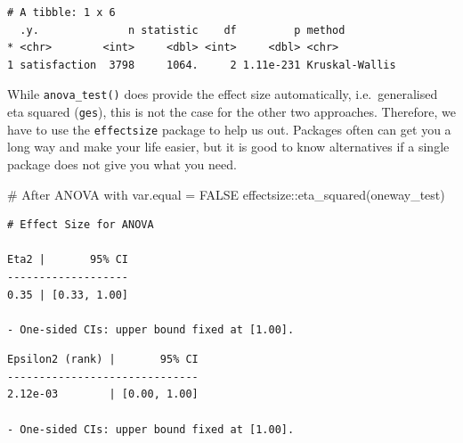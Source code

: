 \documentclass[
  letterpaper,
]{krantz}
\makeatletter
\newenvironment{Shaded}{\begin{snugshade}}{\end{snugshade}}
\newcommand{\CommentTok}[1]{\textcolor[rgb]{0.37,0.37,0.37}{#1}}
\newcommand{\FunctionTok}[1]{\textcolor[rgb]{0.28,0.35,0.67}{#1}}
\newcommand{\NormalTok}[1]{\textcolor[rgb]{0.00,0.23,0.31}{#1}}
\newcommand{\SpecialCharTok}[1]{\textcolor[rgb]{0.37,0.37,0.37}{#1}}
\newenvironment{kframe}{%
\medskip{}
\setlength{\fboxsep}{.8em}
 \def\at@end@of@kframe{}%
 \ifinner\ifhmode%
  \def\at@end@of@kframe{\end{minipage}}%
  \begin{minipage}{\columnwidth}%
 \fi\fi%
 \def\FrameCommand##1{\hskip\@totalleftmargin \hskip-\fboxsep
 \colorbox{shadecolor}{##1}\hskip-\fboxsep
     \hskip-\linewidth \hskip-\@totalleftmargin \hskip\columnwidth}%
 \MakeFramed {\advance\hsize-\width
   \@totalleftmargin\z@ \linewidth\hsize
   \@setminipage}}%
 {\par\unskip\endMakeFramed%
 \at@end@of@kframe}
\renewenvironment{Shaded}{\begin{kframe}}{\end{kframe}}
\makeatother
\begin{document}
\begin{verbatim}
# A tibble: 1 x 6
  .y.              n statistic    df         p method        
* <chr>        <int>     <dbl> <int>     <dbl> <chr>         
1 satisfaction  3798     1064.     2 1.11e-231 Kruskal-Wallis
\end{verbatim}

While \texttt{anova\_test()} does provide the effect size automatically,
i.e.~generalised eta squared (\texttt{ges}), this is not the case for
the other two approaches. Therefore, we have to use the
\texttt{effectsize} package to help us out. Packages often can get you a
long way and make your life easier, but it is good to know alternatives
if a single package does not give you what you need.

\begin{Shaded}
\begin{Highlighting}[]
\CommentTok{\# After ANOVA with var.equal = FALSE}
\NormalTok{effectsize}\SpecialCharTok{::}\FunctionTok{eta\_squared}\NormalTok{(oneway\_test)}
\end{Highlighting}
\end{Shaded}

\begin{verbatim}
# Effect Size for ANOVA

Eta2 |       95% CI
-------------------
0.35 | [0.33, 1.00]

- One-sided CIs: upper bound fixed at [1.00].
\end{verbatim}

\begin{Shaded}
\end{Shaded}

\begin{verbatim}
Epsilon2 (rank) |       95% CI
------------------------------
2.12e-03        | [0.00, 1.00]

- One-sided CIs: upper bound fixed at [1.00].
\end{verbatim}
\end{document}

